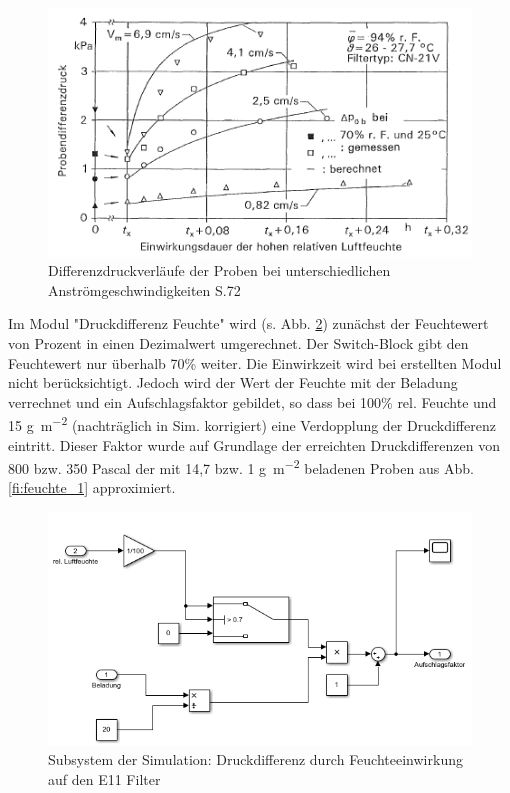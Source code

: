    \begin{figure}[H]
    \begin{center}
        \includegraphics[width=0.9\linewidth]{images/feuchte_2.png}
        \caption[Differenzdruckverläufe Filterproben]{Differenzdruckverläufe der Proben bei unterschiedlichen Anströmgeschwindigkeiten \cite{feuchte} S.72}
        \label{fi:feuchte_2}
    \end{center}
\end{figure}
    Im Modul "Druckdifferenz Feuchte" wird (s. Abb. \ref{fi:sim_feuchte}) zunächst der Feuchtewert von Prozent in einen Dezimalwert umgerechnet. Der Switch-Block gibt den Feuchtewert nur überhalb 70\% weiter. Die Einwirkzeit wird bei erstellten Modul nicht berücksichtigt. Jedoch wird der Wert der Feuchte mit der Beladung verrechnet und ein Aufschlagsfaktor gebildet, so dass bei 100\% rel. Feuchte und 15 \si{\gram\per\square\metre} (nachträglich in Sim. korrigiert) eine Verdopplung der Druckdifferenz eintritt. Dieser Faktor wurde auf Grundlage der erreichten Druckdifferenzen von 800 bzw. 350 Pascal der mit 14,7 bzw. 1 \si{\gram\per\square\metre} beladenen Proben aus Abb. \ref{fi:feuchte_1} approximiert.
    \begin{figure}[H]
        \begin{center}
            \includegraphics[width=0.9\linewidth]{images/sim_feuchte.png}
            \caption[Subsystem Druckdifferenz Feuchte]{Subsystem der Simulation: Druckdifferenz durch Feuchteeinwirkung auf den E11 Filter}
            \label{fi:sim_feuchte}
        \end{center}
    \end{figure}
